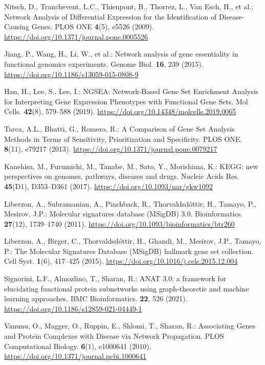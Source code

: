 \documentclass{article}
\begin{document}
\begin{thebibliography}{spmpsci}
Nitsch, D., Tranchevent, L.C., Thienpont, B., Thorrez, L., Van Esch, H., et al.:
Network Analysis of Differential Expression for the Identification of Disease-Causing Genes.
PLOS ONE \textbf{4}(5), e5526 (2009).
\url{https://doi.org/10.1371/journal.pone.0005526}

Jiang, P., Wang, H., Li, W., et al.:
Network analysis of gene essentiality in functional genomics experiments.
Genome Biol. \textbf{16}, 239 (2015).
\url{https://doi.org/10.1186/s13059-015-0808-9}

Han, H., Lee, S., Lee, I.:
NGSEA: Network-Based Gene Set Enrichment Analysis for Interpreting Gene Expression Phenotypes with Functional Gene Sets.
Mol Cells. \textbf{42}(8), 579--588 (2019).
\url{https://doi.org/10.14348/molcells.2019.0065}

Tarca, A.L., Bhatti, G., Romero, R.:
A Comparison of Gene Set Analysis Methods in Terms of Sensitivity, Prioritization and Specificity.
PLOS ONE. \textbf{8}(11), e79217 (2013).
\url{https://doi.org/10.1371/journal.pone.0079217}

Kanehisa, M., Furumichi, M., Tanabe, M., Sato, Y., Morishima, K.:
KEGG: new perspectives on genomes, pathways, diseases and drugs.
Nucleic Acids Res. \textbf{45}(D1), D353--D361 (2017).
\url{https://doi.org/10.1093/nar/gkw1092}


Liberzon, A., Subramanian, A., Pinchback, R., Thorvaldsdóttir, H., Tamayo, P., Mesirov, J.P.:
Molecular signatures database (MSigDB) 3.0.
Bioinformatics. \textbf{27}(12), 1739--1740 (2011).
\url{https://doi.org/10.1093/bioinformatics/btr260}

Liberzon, A., Birger, C., Thorvaldsdóttir, H., Ghandi, M., Mesirov, J.P., Tamayo, P.:
The Molecular Signatures Database (MSigDB) hallmark gene set collection.
Cell Syst. \textbf{1}(6), 417--425 (2015).
\url{https://doi.org/10.1016/j.cels.2015.12.004}

Signorini, L.F., Almozlino, T., Sharan, R.:
ANAT 3.0: a framework for elucidating functional protein subnetworks using graph-theoretic and machine learning approaches.
BMC Bioinformatics. \textbf{22}, 526 (2021).
\url{https://doi.org/10.1186/s12859-021-04449-1}

Vanunu, O., Magger, O., Ruppin, E., Shlomi, T., Sharan, R.:
Associating Genes and Protein Complexes with Disease via Network Propagation.
PLOS Computational Biology. \textbf{6}(1), e1000641 (2010).
\url{https://doi.org/10.1371/journal.pcbi.1000641}


\end{thebibliography}
\end{document}
